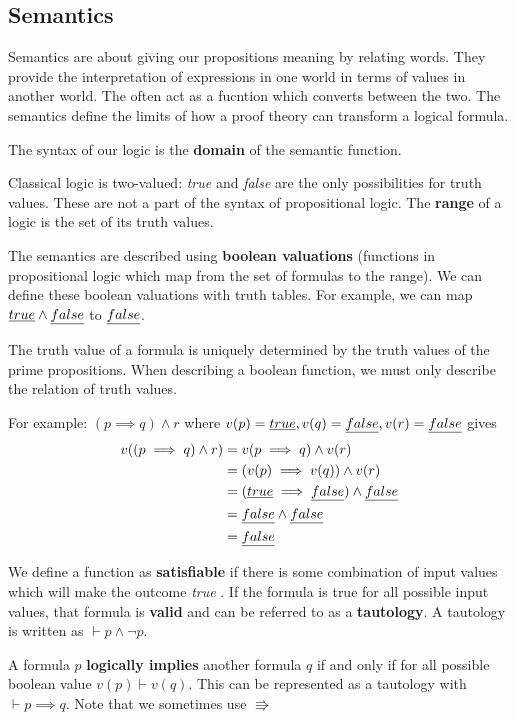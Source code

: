 \documentclass[12pt]{article}
\begin{document}
\subsection*{Semantics}
Semantics are about giving our propositions meaning by relating words. They provide the interpretation of expressions in one world in terms of values in another world. The often act as a fucntion which converts between the two. The semantics define the limits of how a proof theory can transform a logical formula.

The syntax of our logic is the {\bf domain} of the semantic function.

Classical logic is two-valued: \emph{true} and \emph{false} are the only possibilities for truth values. These are not a part of the syntax of propositional logic. The {\bf range} of a logic is the set of its truth values.

The semantics are described using {\bf boolean valuations} (functions in propositional logic which map from the set of formulas to the range). We can define these boolean valuations with truth tables. For example, we can map $\emph{true} \land \emph{false}$ to $\emph{false}$.

The truth value of a formula is uniquely determined by the truth values of the prime propositions. When describing a boolean function, we must only describe the relation of truth values.

For example: $(p \implies q) \land r$ where $v(p) = \emph{true}, v(q) = \emph{false}, v(r) = \emph{false}$ gives
\begin{align*}
v((p \implies q) \land r) &= v(p \implies q) \land v(r)\\
                          &= (v(p) \implies v(q)) \land v(r)\\
                          &= (\emph{true} \implies \emph{false}) \land \emph{false}\\
                          &= \emph{false} \land \emph{false}\\
                          &= \emph{false}
\end{align*}

We define a function as {\bf satisfiable} if there is some combination of input values which will make the outcome \emph{true} . If the formula is true for all possible input values, that formula is {\bf valid} and can be referred to as a {\bf tautology}. A tautology is written as $\vdash p \land \neg p$.

A formula $p$ {\bf logically implies} another formula $q$ if and only if for all possible boolean value $v(p) \vdash v(q)$. This can be represented as a tautology with $\vdash p \implies q$. Note that we sometimes use $\Rrightarrow$
\end{document}
